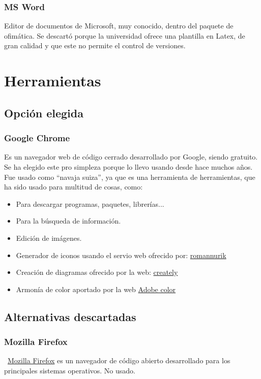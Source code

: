\subsubsection{MS Word}
Editor de documentos de Microsoft, muy conocido, dentro del paquete de ofimática. Se descartó porque la universidad ofrece una plantilla en Latex, de gran calidad y que este no permite el control de versiones.

\section{Herramientas}

\subsection{Opción elegida}

\subsubsection{Google Chrome}
Es un navegador web de código cerrado desarrollado por Google, siendo gratuito. Se ha elegido este pro simpleza porque lo llevo usando desde hace muchos años. Fue usado como ``navaja suiza'', ya que es una herramienta de herramientas, que ha sido usado para multitud de cosas, como:

\begin{itemize}
	\item Para descargar programas, paquetes, librerías...
	\item Para la búsqueda de información.
	\item Edición de imágenes.
	\item Generador de iconos usando el servio web ofrecido por: \href{https://romannurik.github.io/AndroidAssetStudio}{romannurik}
	\item Creación de diagramas ofrecido por la web: \href{https://app.creately.com}{creately}
	\item Armonía de color aportado por la web \href{https://color.adobe.com/es/create/color-wheel}{Adobe color}
\end{itemize}

\subsection{Alternativas descartadas}

\subsubsection{Mozilla Firefox}\label{mozilla}
~\href{https://www.mozilla.org/es-ES/firefox/new/}{Mozilla Firefox} es un navegador de código abierto desarrollado para los principales sistemas operativos. No usado.

